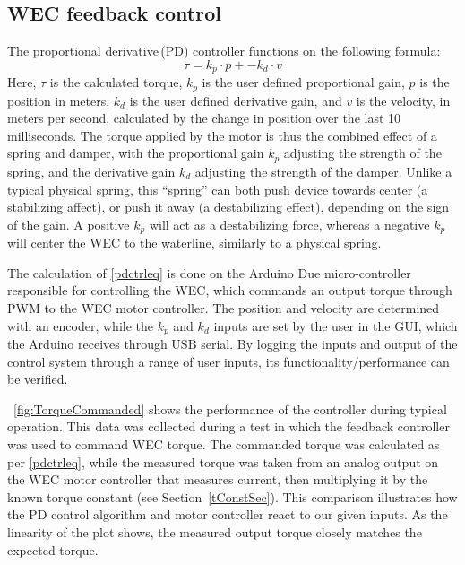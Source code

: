 \documentclass[hardware,article,submit,pdftex,moreauthors]{Definitions/mdpi}
\begin{document}
\subsection{WEC feedback control}
The proportional derivative\,(PD) controller functions on the following formula:
%
\begin{equation}  \label{pdctrleq}
  \tau = k_p \cdot p + -k_d \cdot v
\end{equation}
%
Here, $\tau$ is the calculated torque, $k_p$ is the user defined proportional gain, $p$ is the position in meters, $k_d$ is the user defined derivative gain, and $v$ is the velocity, in meters per second, calculated by the change in position over the last 10 milliseconds. 
The torque applied by the motor is thus the combined effect of a spring and damper, with the proportional gain $k_p$ adjusting the strength of the spring, and the derivative gain $k_d$ adjusting the strength of the damper.
Unlike a typical physical spring, this ``spring'' can both push device towards center (a stabilizing affect), or push it away (a destabilizing effect), depending on the sign of the gain.
A positive $k_p$ will act as a destabilizing force, whereas a negative $k_p$ will center the WEC to the waterline, similarly to a physical spring.

The calculation of \eqref{pdctrleq} is done on the Arduino Due micro-controller responsible for controlling the WEC, which commands an output torque through PWM to the WEC motor controller.
The position and velocity are determined with an encoder, while the $k_p$ and $k_d$ inputs are set by the user in the GUI, which the Arduino receives through USB serial.
By logging the inputs and output of the control system through a range of user inputs, its functionality/performance can be verified.

\figurename~\ref{fig:TorqueCommanded} shows the performance of the controller during typical operation.
This data was collected during a test in which the feedback controller was used to command WEC torque.
The commanded torque was calculated as per \eqref{pdctrleq}, while the measured torque was taken from an analog output on the WEC motor controller that measures current, then multiplying it by the known torque constant (see Section~\ref{tConstSec}).
This comparison illustrates how the PD control algorithm and motor controller react to our given inputs.
As the linearity of the plot shows, the measured output torque closely matches the expected torque.
\end{document}
